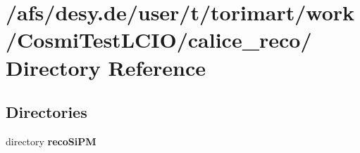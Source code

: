 \section{/afs/desy.de/user/t/torimart/work/CosmiTestLCIO/calice\_\-reco/ Directory Reference}
\label{dir_f98b43a53f5533225f05987ae358305b}
\subsection*{Directories}
\begin{DoxyCompactItemize}
\item 
directory {\bf recoSiPM}
\end{DoxyCompactItemize}
